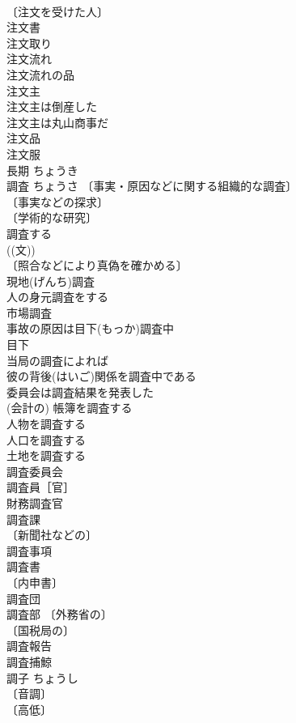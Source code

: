 \documentclass[8pt]{extreport}
\begin{document}
\begin{CJK}{UTF8}{min}
\\	〔注文を受けた人〕
\\	注文書 
\\	注文取り 
\\	注文流れ 
\\	注文流れの品 
\\	注文主 
\\	注文主は倒産した 
\\	注文主は丸山商事だ 
\\	注文品 
\\	注文服 
\\	長期	ちょうき	
\\	調査	ちょうさ	〔事実・原因などに関する組織的な調査〕
\\	〔事実などの探求〕
\\	〔学術的な研究〕
\\	調査する 
\\	((文)) 
\\	〔照合などにより真偽を確かめる〕
\\	現地(げんち)調査 
\\	人の身元調査をする 
\\	市場調査 
\\	事故の原因は目下(もっか)調査中 
\\	目下　
\\	当局の調査によれば 
\\	彼の背後(はいご)関係を調査中である 
\\	委員会は調査結果を発表した 
\\	(会計の) 帳簿を調査する 
\\	人物を調査する 
\\	人口を調査する 
\\	土地を調査する 
\\	調査委員会 
\\	調査員［官］ 
\\	財務調査官 
\\	調査課 
\\	〔新聞社などの〕
\\	調査事項 
\\	調査書 
\\	〔内申書〕
\\	調査団 
\\	調査部 〔外務省の〕
\\	〔国税局の〕
\\	調査報告 
\\	調査捕鯨 
\\	調子	ちょうし	
\\	〔音調〕
\\	〔高低〕

\end{CJK}
\end{document}
